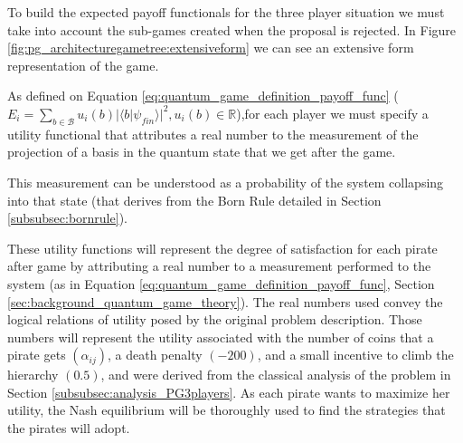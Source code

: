 To build the expected payoff functionals for the three player situation we must take into account the sub-games created when the proposal is rejected. In Figure \ref{fig:pg_architecturegametree:extensiveform} we can see an extensive form representation of the game.

As defined on Equation \ref{eq:quantum_game_definition_payoff_func} ($ E_{i}=\sum_{b \in \mathcal{B}} u_{i}(b)\vert \langle b\vert \psi_{fin}\rangle\vert^{2}, u_{i}(b) \in \mathbb{R} $),for each player we must specify a utility functional that attributes a real number to the measurement of the projection of a basis in the quantum state that we get after the game. 


This measurement can be understood as a probability of the system collapsing into that state (that derives from the Born Rule detailed in Section \ref{subsubsec:bornrule}).


These utility functions will represent the degree of satisfaction for each pirate after game by attributing a real number to a measurement performed to the system (as in Equation \ref{eq:quantum_game_definition_payoff_func}, Section \ref{sec:background_quantum_game_theory}). 
The real numbers used convey the logical relations of utility posed by the original problem description. Those numbers will represent the utility associated with the number of coins that a pirate gets $(\alpha_{ij})$, a death penalty $(-200)$, and a small incentive to climb the hierarchy $(0.5)$, and were derived from the classical analysis of the problem in Section \ref{subsubsec:analysis_PG3players}. 
As each pirate wants to maximize her utility, the Nash equilibrium will be thoroughly used to find the strategies that the pirates will adopt\cite{nash50}\cite{Nash51}.



